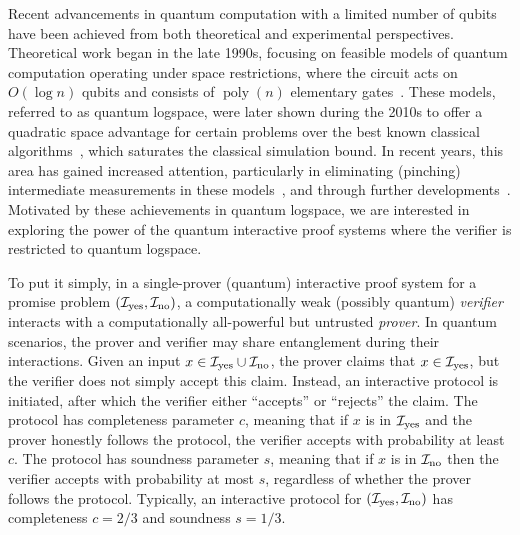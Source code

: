 \documentclass[11pt, a4paper]{article}
\numberwithin{equation}{section}
\numberwithin{figure}{section}
\newcommand{\yes}{{\rm yes}}
\newcommand{\no}{{\rm no}}
\DeclareMathOperator\poly{poly}
\newcommand{\calI}{\mathcal{I}}
\begin{document}
Recent advancements in quantum computation with a limited number of qubits have been achieved from both theoretical and experimental perspectives. Theoretical work began in the late 1990s, focusing on feasible models of quantum computation operating under space restrictions, where the circuit acts on $O(\log n)$ qubits and consists of $\poly(n)$ elementary gates~\cite{Wat99,Wat03}. These models, referred to as quantum logspace, were later shown during the 2010s to offer a quadratic space advantage for certain problems over the best known classical algorithms~\cite{TS13,FL18}, which saturates the classical simulation bound. In recent years, this area has gained increased attention, particularly in eliminating (pinching) intermediate measurements in these models~\cite{FR21,GRZ21}, and through further developments~\cite{GR22,Zhandry24}. Motivated by these achievements in quantum logspace, we are interested in exploring the power of the quantum interactive proof systems where the verifier is restricted to quantum logspace. 

To put it simply, in a single-prover (quantum) interactive proof system for a promise problem $(\calI_{\yes},\calI_{\no})$, a computationally weak (possibly quantum) \textit{verifier} interacts with a computationally all-powerful but untrusted \textit{prover}. In quantum scenarios, the prover and verifier may share entanglement during their interactions. Given an input $x\in \calI_\yes \cup \calI_\no$, the prover claims that $x \in \calI_{\yes}$, but the verifier does not simply accept this claim. Instead, an interactive protocol is initiated, after which the verifier either ``accepts'' or ``rejects'' the claim. The protocol has completeness parameter $c$, meaning that if $x$ is in $\calI_{\yes}$ and the prover honestly follows the protocol, the verifier accepts with probability at least $c$. The protocol has soundness parameter $s$, meaning that if $x$ is in $\calI_{\no}$ then the verifier accepts with probability at most $s$, regardless of whether the prover follows the protocol. Typically, an interactive protocol for $(\calI_{\yes},\calI_{\no})$ has completeness $c=2/3$ and soundness $s=1/3$. 
\end{document}
